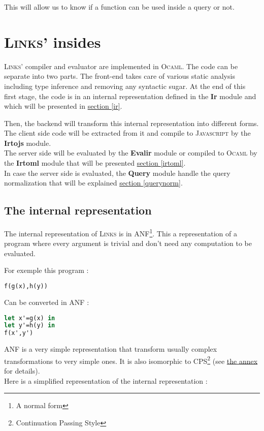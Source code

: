 \documentclass[11pt]{article}
\newcommand\mysc[1]{{\rmfamily\textsc{#1}}\xspace}
\newcommand\links{\mysc{Links}}
\newcommand\js{\mysc{Javascript}}
\newcommand\ocaml{\mysc{Ocaml}}
\newcommand\refsec[1]{\hyperref[#1]{section \ref*{#1}}}
\newcommand\module[1]{{\bf #1}}
\begin{document}
This will allow us to know if a function can be used inside a query or not.

\section{\links' insides}

\links' compiler and evaluator are implemented in \ocaml. 
The code can be separate into two parts. 
The front-end takes care of various static analysis including type inference and removing any syntactic sugar. 
At the end of this first stage, the code is in an internal representation defined in the \module{Ir} module and which will be presented in \refsec{ir}. 

Then, the backend will transform this internal representation into different forms.\\
The client side code will be extracted from it and compile to \js by the \module{Irtojs} module.\\
The server side will be evaluated by the \module{Evalir} module or compiled to \ocaml by the \module{Irtoml} module that will be presented \refsec{irtoml}.\\
In case the server side is evaluated, the \module{Query} module handle the query normalization that will be explained \refsec{querynorm}.

\subsection{The internal representation \label{ir}}

The internal representation of \links is in ANF\footnote{A normal form}. This a representation of a program where every argument is trivial and don't need any computation to be evaluated. 

For exemple this program :
\begin{lstlisting}[language=ML]
f(g(x),h(y))
\end{lstlisting}
Can be converted in ANF :
\begin{lstlisting}[language=ML]
let x'=g(x) in
let y'=h(y) in
f(x',y')
\end{lstlisting}

ANF is a very simple representation that transform usually complex transformations to very simple ones. It is also isomorphic to CPS\footnote{Continuation Passing Style} (see \hyperref[cps]{the annex} for details).\\

Here is a simplified representation of the internal representation :
\end{document}
